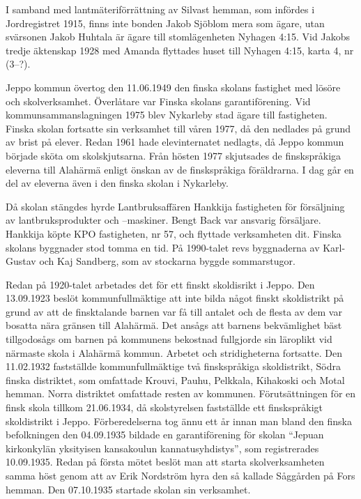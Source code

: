 I samband med lantmäteriförrättning av Silvast hemman, som infördes i Jordregistret 1915, finns inte bonden Jakob Sjöblom mera som ägare, utan svärsonen Jakob Huhtala är ägare till stomlägenheten Nyhagen 4:15. Vid Jakobs tredje äktenskap 1928 med Amanda flyttades huset till	Nyhagen 4:15, karta 4, nr (3--?).




Jeppo kommun övertog den 11.06.1949 den finska skolans fastighet med lösöre och skolverksamhet. Överlåtare var Finska  skolans garantiförening. Vid kommunsammanslagningen 1975 blev Nykarleby stad ägare till fastigheten. Finska skolan fortsatte sin verksamhet till våren 1977, då den nedlades på grund av brist på elever. Redan 1961 hade elevinternatet nedlagts, då Jeppo kommun började sköta om skolskjutsarna. Från hösten 1977 skjutsades de finskspråkiga eleverna till Alahärmä enligt önskan av de finskspråkiga föräldrarna. I dag går en del av eleverna även i den finska skolan i Nykarleby.

Då skolan stängdes hyrde Lantbruksaffären Hankkija fastigheten för försäljning av lantbruksprodukter och –maskiner. Bengt Back var ansvarig försäljare. Hankkija köpte KPO fastigheten, nr 57, och 	flyttade verksamheten dit. Finska skolans byggnader stod tomma en tid. På 1990-talet revs byggnaderna av Karl-Gustav och Kaj Sandberg, som av stockarna byggde sommarstugor.


Redan på 1920-talet arbetades det för ett finskt skoldisrikt i Jeppo.	Den 13.09.1923 beslöt kommunfullmäktige att inte bilda något finskt skoldistrikt på grund av att de finsktalande barnen var få till antalet och de flesta av dem var bosatta nära gränsen till Alahärmä. Det ansågs att barnens bekvämlighet bäst tillgodosågs om barnen på kommunens 	bekostnad fullgjorde sin läroplikt vid närmaste skola i Alahärmä kommun. Arbetet och stridigheterna fortsatte. Den 11.02.1932 fastställde kommunfullmäktige två finskspråkiga skoldistrikt, Södra finska distriktet, som omfattade Krouvi, Pauhu, Pelkkala, Kihakoski och Motal	hemman. Norra distriktet omfattade resten av kommunen.
Förutsättningen för en finsk skola tillkom 21.06.1934, då skolstyrelsen fastställde ett finskspråkigt skoldistrikt i Jeppo. Förberedelserna tog ännu ett år innan man bland den finska befolkningen den 04.09.1935	bildade en garantiförening för skolan ``Jepuan kirkonkylän yksityisen	kansakoulun kannatusyhdistys'', som registrerades 10.09.1935.	Redan på första mötet beslöt man att starta skolverksamheten samma höst genom att av Erik Nordström hyra den så kallade Såggården på	Fors hemman. Den 07.10.1935 startade skolan sin verksamhet.

